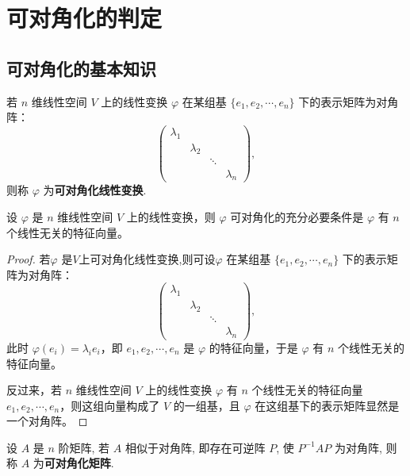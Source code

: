 \documentclass[../../main.tex]{subfiles}
\begin{document}
\section{可对角化的判定}

\subsection{可对角化的基本知识}

\begin{definition}[可对角化线性变换]
若 $n$ 维线性空间 $V$ 上的线性变换 $\varphi$ 在某组基 $\{e_1, e_2, \cdots, e_n\}$ 下的表示矩阵为对角阵：
\[
\begin{pmatrix}
\lambda_1 & & & \\
& \lambda_2 & & \\
& & \ddots & \\
& & & \lambda_n
\end{pmatrix},
\]
则称 $\varphi$ 为\textbf{可对角化线性变换}.
\end{definition}

\begin{theorem}[线性变换可对角化的充要条件]\label{theorem:线性变换可对角化的充要条件}
设 $\varphi$ 是 $n$ 维线性空间 $V$ 上的线性变换，则 $\varphi$ 可对角化的充分必要条件是 $\varphi$ 有 $n$ 个线性无关的特征向量。
\end{theorem}
\begin{proof}
若$\varphi$ 是$V$上可对角化线性变换,则可设$\varphi$ 在某组基 $\{e_1, e_2, \cdots, e_n\}$ 下的表示矩阵为对角阵：
\[
\begin{pmatrix}
\lambda_1 & & & \\
& \lambda_2 & & \\
& & \ddots & \\
& & & \lambda_n
\end{pmatrix},
\]
此时 $\varphi(e_i) = \lambda_i e_i$，即 $e_1, e_2, \cdots, e_n$ 是 $\varphi$ 的特征向量，于是 $\varphi$ 有 $n$ 个线性无关的特征向量。

反过来，若 $n$ 维线性空间 $V$ 上的线性变换 $\varphi$ 有 $n$ 个线性无关的特征向量 $e_1, e_2, \cdots, e_n$，则这组向量构成了 $V$ 的一组基，且 $\varphi$ 在这组基下的表示矩阵显然是一个对角阵。
\end{proof}

\begin{definition}[可对角化矩阵]
设 $A$ 是 $n$ 阶矩阵, 若 $A$ 相似于对角阵, 即存在可逆阵 $P$, 使 $P^{-1}AP$ 为对角阵, 则称 $A$ 为\textbf{可对角化矩阵}.
\end{definition}
\end{document}
